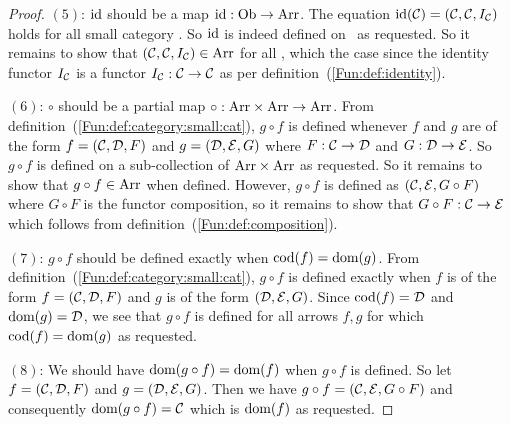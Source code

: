 \begin{proof}
    $(5)$: $\mbox{\rm id}$ should be a map $\mbox{\rm id}:\mbox{\rm Ob}\to\mbox{\rm Arr}$. The equation $\mbox{\rm id}(\mbox{$\cal C$})
    =(\mbox{$\cal C$},\mbox{$\cal C$},I_{\cal C})$ holds for all small category \Cat. So $\mbox{\rm id}$
    is indeed defined on \ob\ as requested. So it remains to show that
    $(\mbox{$\cal C$},\mbox{$\cal C$},I_{\cal C})\in\mbox{\rm Arr}$ for all \Cat, which the case since
    the identity functor $I_{\cal C}$ is a functor $I_{\cal C}:\mbox{$\cal C$}\to\mbox{$\cal C$}$ as 
    per definition~(\ref{Fun:def:identity}).

    $(6)$: $\circ$ should be a partial map $\circ:\mbox{\rm Arr}\times\mbox{\rm Arr}\to\mbox{\rm Arr}$.
    From definition~(\ref{Fun:def:category:small:cat}), $g\circ f$ is defined
    whenever $f$ and $g$ are of the form $f=(\mbox{$\cal C$},\mbox{$\cal D$},F)$ and $g=(\mbox{$\cal D$},\mbox{$\cal E$},G)$
    where $F:\mbox{$\cal C$}\to\mbox{$\cal D$}$ and $G:\mbox{$\cal D$}\to\mbox{$\cal E$}$. So $g\circ f$ is defined on
    a sub-collection of $\mbox{\rm Arr}\times\mbox{\rm Arr}$ as requested. So it remains to 
    show that $g\circ f\in\mbox{\rm Arr}$ when defined. However, $g\circ f$ is defined
    as $(\mbox{$\cal C$},\mbox{$\cal E$},G \circ F)$ where $G\circ F$ is the functor composition,
    so it remains to show that $G\circ F:\mbox{$\cal C$}\to\mbox{$\cal E$}$ which follows from
    definition~(\ref{Fun:def:composition}).

    $(7)$: $g\circ f$ should be defined exactly when $\mbox{\rm cod}(f)=\mbox{\rm dom}(g)$. From
    definition~(\ref{Fun:def:category:small:cat}), $g\circ f$ is defined 
    exactly when $f$ is of the form $f=(\mbox{$\cal C$},\mbox{$\cal D$},F)$ and $g$ is of the form
    $(\mbox{$\cal D$},\mbox{$\cal E$},G)$. Since $\mbox{\rm cod}(f)=\mbox{$\cal D$}$ and $\mbox{\rm dom}(g)=\mbox{$\cal D$}$, we see that
    $g\circ f$ is defined for all arrows $f,g$ for which $\mbox{\rm cod}(f)=\mbox{\rm dom}(g)$ 
    as requested.

    $(8)$: We should have $\mbox{\rm dom}(g\circ f) = \mbox{\rm dom}(f)$ when $g\circ f$ is defined.
    So let $f=(\mbox{$\cal C$},\mbox{$\cal D$},F)$ and $g=(\mbox{$\cal D$},\mbox{$\cal E$},G)$. Then we have 
    $g\circ f=(\mbox{$\cal C$},\mbox{$\cal E$},G\circ F)$ and consequently $\mbox{\rm dom}(g\circ f)=\mbox{$\cal C$}$ which
    is $\mbox{\rm dom}(f)$ as requested.
\end{proof}
